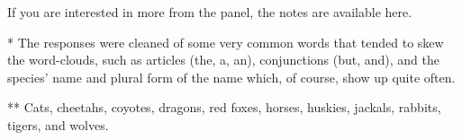 If you are interested in more from the panel, the notes are available here.

* The responses were cleaned of some very common words that tended to skew the word-clouds, such as articles (the, a, an), conjunctions (but, and), and the species' name and plural form of the name which, of course, show up quite often.

** Cats, cheetahs, coyotes, dragons, red foxes, horses, huskies, jackals, rabbits, tigers, and wolves.
